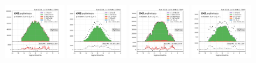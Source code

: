 \begin{figure}
    \includegraphics[width=0.24\textwidth]{appendices/qcdSF/figures/4j1b/mu_leptonOneEta_True_mcqcd.png}
    \includegraphics[width=0.24\textwidth]{appendices/qcdSF/figures/4j1b/mu_leptonOneEta_False.png}
    \includegraphics[width=0.24\textwidth]{appendices/qcdSF/figures/4j1b/e_leptonOneEta_True_mcqcd.png}
    \includegraphics[width=0.24\textwidth]{appendices/qcdSF/figures/4j1b/e_leptonOneEta_False.png}
    

\end{figure}
